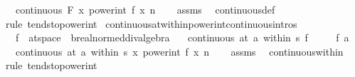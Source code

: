 \begin{isabellebody}
\ \ \ {\isachardoublequoteopen}continuous\ F\ {\isacharparenleft}{\kern0pt}{\isasymlambda}x{\isachardot}{\kern0pt}\ power{\isacharunderscore}{\kern0pt}int\ {\isacharparenleft}{\kern0pt}f\ x{\isacharparenright}{\kern0pt}\ n{\isacharparenright}{\kern0pt}{\isachardoublequoteclose}\isanewline
%
\isadelimproof
\ \ %
\endisadelimproof
%
\isatagproof
{}\isamarkupfalse%
\ assms\ \isamarkupfalse%
\ continuous{\isacharunderscore}{\kern0pt}def\ \isamarkupfalse%
\ {\isacharparenleft}{\kern0pt}rule\ tendsto{\isacharunderscore}{\kern0pt}power{\isacharunderscore}{\kern0pt}int{\isacharparenright}{\kern0pt}%
\endisatagproof
{\isafoldproof}%
%
\isadelimproof
\isanewline
%
\endisadelimproof
\isanewline
{}\isamarkupfalse%
\ continuous{\isacharunderscore}{\kern0pt}at{\isacharunderscore}{\kern0pt}within{\isacharunderscore}{\kern0pt}power{\isacharunderscore}{\kern0pt}int{\isacharbrackleft}{\kern0pt}continuous{\isacharunderscore}{\kern0pt}intros{\isacharbrackright}{\kern0pt}{\isacharcolon}{\kern0pt}\isanewline
\ \ \ f\ {\isacharcolon}{\kern0pt}{\isacharcolon}{\kern0pt}\ {\isachardoublequoteopen}{\isacharprime}{\kern0pt}a{\isacharcolon}{\kern0pt}{\isacharcolon}{\kern0pt}t{}{\isacharunderscore}{\kern0pt}space\ {\isasymRightarrow}\ {\isacharprime}{\kern0pt}b{\isacharcolon}{\kern0pt}{\isacharcolon}{\kern0pt}real{\isacharunderscore}{\kern0pt}normed{\isacharunderscore}{\kern0pt}div{\isacharunderscore}{\kern0pt}algebra{\isachardoublequoteclose}\isanewline
\ \ \ {\isachardoublequoteopen}continuous\ {\isacharparenleft}{\kern0pt}at\ a\ within\ s{\isacharparenright}{\kern0pt}\ f{\isachardoublequoteclose}\isanewline
\ \ \ \ \ {\isachardoublequoteopen}f\ a\ {\isasymnoteq}\ {}{\isachardoublequoteclose}\isanewline
\ \ \ {\isachardoublequoteopen}continuous\ {\isacharparenleft}{\kern0pt}at\ a\ within\ s{\isacharparenright}{\kern0pt}\ {\isacharparenleft}{\kern0pt}{\isasymlambda}x{\isachardot}{\kern0pt}\ power{\isacharunderscore}{\kern0pt}int\ {\isacharparenleft}{\kern0pt}f\ x{\isacharparenright}{\kern0pt}\ n{\isacharparenright}{\kern0pt}{\isachardoublequoteclose}\isanewline
%
\isadelimproof
\ \ %
\endisadelimproof
%
\isatagproof
{}\isamarkupfalse%
\ assms\ \isamarkupfalse%
\ continuous{\isacharunderscore}{\kern0pt}within\ \isamarkupfalse%
\ {\isacharparenleft}{\kern0pt}rule\ tendsto{\isacharunderscore}{\kern0pt}power{\isacharunderscore}{\kern0pt}int{\isacharparenright}{\kern0pt}%

\end{isabellebody}

